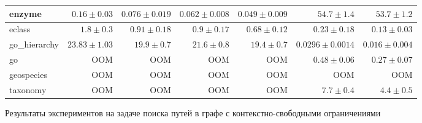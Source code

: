\begin{frame}
\begin{figure}[H]
\begin{table}[]
{\begin{tabular}{|l|rrrrrr|}
enzyme &
  \multicolumn{1}{r|}{$0.16 \pm 0.03$} &
  \multicolumn{1}{r|}{$0.076 \pm 0.019$} &
  \multicolumn{1}{r|}{$0.062 \pm 0.008$} &
  \multicolumn{1}{r|}{$0.049 \pm 0.009$} &
  \multicolumn{1}{r|}{$54.7 \pm 1.4$} &
  $53.7 \pm 1.2$ \\ \hline
eclass &
  \multicolumn{1}{r|}{$1.8 \pm 0.3$} &
  \multicolumn{1}{r|}{$0.91 \pm 0.18$} &
  \multicolumn{1}{r|}{$0.9 \pm 0.17$} &
  \multicolumn{1}{r|}{$0.68 \pm 0.12$} &
  \multicolumn{1}{r|}{$0.23 \pm 0.18$} &
  $0.13 \pm 0.03$ \\ \hline
go\_hierarchy &
  \multicolumn{1}{r|}{$23.83 \pm 1.03$} &
  \multicolumn{1}{r|}{$19.9 \pm 0.7$} &
  \multicolumn{1}{r|}{$21.6 \pm 0.8$} &
  \multicolumn{1}{r|}{$19.4 \pm 0.7$} &
  \multicolumn{1}{r|}{$0.0296 \pm 0.0014$} &
  $0.016 \pm 0.004$ \\ \hline
go &
  \multicolumn{1}{r|}{OOM} &
  \multicolumn{1}{r|}{OOM} &
  \multicolumn{1}{r|}{OOM} &
  \multicolumn{1}{r|}{OOM} &
  \multicolumn{1}{r|}{$0.48 \pm 0.06$} &
  $0.27 \pm 0.07$ \\ \hline
geospecies &
  \multicolumn{1}{r|}{OOM} &
  \multicolumn{1}{r|}{OOM} &
  \multicolumn{1}{r|}{OOM} &
  \multicolumn{1}{r|}{OOM} &
  \multicolumn{1}{r|}{OOM} &
  OOM \\ \hline
taxonomy &
  \multicolumn{1}{r|}{OOM} &
  \multicolumn{1}{r|}{OOM} &
  \multicolumn{1}{r|}{OOM} &
  \multicolumn{1}{r|}{OOM} &
  \multicolumn{1}{r|}{$7.7 \pm 0.4$} &
  $4.4 \pm 0.5$ \\ \hline
\end{tabular}%
}
\label{tab:results_with_sppf}
\end{table}
\caption{Результаты экспериментов на задаче поиска путей в графе с контекстно-свободными ограничениями}
\end{figure}
\begin{figure}[H]
    \centering
    \begin{table}[]
\end{table}
\end{figure}
\end{frame}
